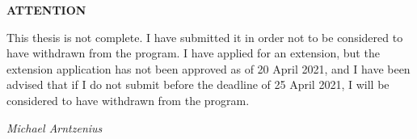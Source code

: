 {\color{Red}

{\centering\huge\sffamily\bfseries ATTENTION\par}
  
\noindent\Large%
%
This thesis is not complete. I have submitted it in order not to be considered to have withdrawn from the program. I have applied for an extension, but the extension application has not been approved as of 20 April 2021, and I have been advised that if I do not submit before the deadline of 25 April 2021, I will be considered to have withdrawn from the program.

\raggedleft
\itshape Michael Arntzenius
\par
}
